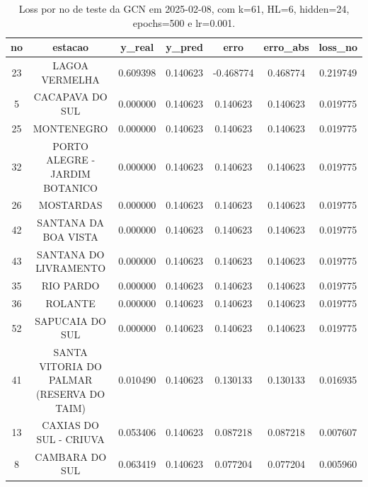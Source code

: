 \begin{table}[h]
\centering
\caption{Loss por no de teste da GCN em 2025-02-08, com k=61, HL=6, hidden=24, epochs=500 e lr=0.001.}
\label{tab:gcn_loss_k61_hl6_h24_e500_d20250208}
\begin{tabular}{ccccccc}
\toprule
no & estacao & y\_real & y\_pred & erro & erro\_abs & loss\_no \\
\midrule
23 & LAGOA VERMELHA & 0.609398 & 0.140623 & -0.468774 & 0.468774 & 0.219749 \\
5 & CACAPAVA DO SUL & 0.000000 & 0.140623 & 0.140623 & 0.140623 & 0.019775 \\
25 & MONTENEGRO & 0.000000 & 0.140623 & 0.140623 & 0.140623 & 0.019775 \\
32 & PORTO ALEGRE - JARDIM BOTANICO & 0.000000 & 0.140623 & 0.140623 & 0.140623 & 0.019775 \\
26 & MOSTARDAS & 0.000000 & 0.140623 & 0.140623 & 0.140623 & 0.019775 \\
42 & SANTANA DA BOA VISTA & 0.000000 & 0.140623 & 0.140623 & 0.140623 & 0.019775 \\
43 & SANTANA DO LIVRAMENTO & 0.000000 & 0.140623 & 0.140623 & 0.140623 & 0.019775 \\
35 & RIO PARDO & 0.000000 & 0.140623 & 0.140623 & 0.140623 & 0.019775 \\
36 & ROLANTE & 0.000000 & 0.140623 & 0.140623 & 0.140623 & 0.019775 \\
52 & SAPUCAIA DO SUL & 0.000000 & 0.140623 & 0.140623 & 0.140623 & 0.019775 \\
41 & SANTA VITORIA DO PALMAR (RESERVA DO TAIM) & 0.010490 & 0.140623 & 0.130133 & 0.130133 & 0.016935 \\
13 & CAXIAS DO SUL - CRIUVA & 0.053406 & 0.140623 & 0.087218 & 0.087218 & 0.007607 \\
8 & CAMBARA DO SUL & 0.063419 & 0.140623 & 0.077204 & 0.077204 & 0.005960 \\
\bottomrule
\end{tabular}
\end{table}

